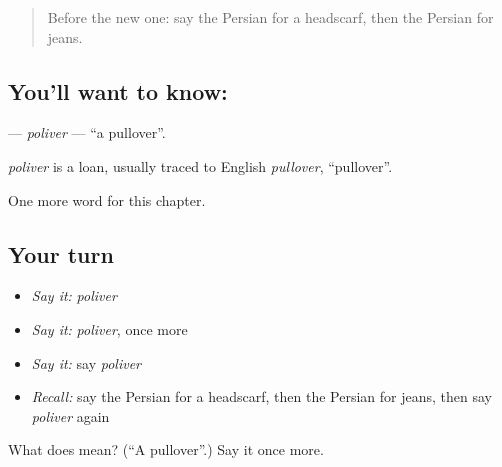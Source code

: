 \label{lesson:FA-C204-poliver}



\begin{quote}
Before the new one: say the Persian for a headscarf, then the Persian for jeans.
\end{quote}

\subsection*{You'll want to know: }
\textbf{} — \emph{poliver} — \textquotedblleft{}a pullover\textquotedblright{}.

\begin{cousinweb}
\emph{poliver} is a loan, usually traced to English \emph{pullover}, \textquotedblleft{}pullover\textquotedblright{}.
\end{cousinweb}

\begin{grammarlens}[title={What you've built}]
One more word for this chapter.
\end{grammarlens}

\subsection*{Your turn}
\begin{itemize}
\raggedright
  \item \emph{Say it:} \emph{poliver}
  \item \emph{Say it:} \emph{poliver}, once more
  \item \emph{Say it:} say \emph{poliver}
  \item \emph{Recall:} say the Persian for a headscarf, then the Persian for jeans, then say \emph{poliver} again
\end{itemize}

\begin{tcolorbox}[breakable,colback=teal!4,colframe=teal!35!black,title={Before you move on}]
What does  mean? (\textquotedblleft{}A pullover\textquotedblright{}.) Say it once more.
\end{tcolorbox}
